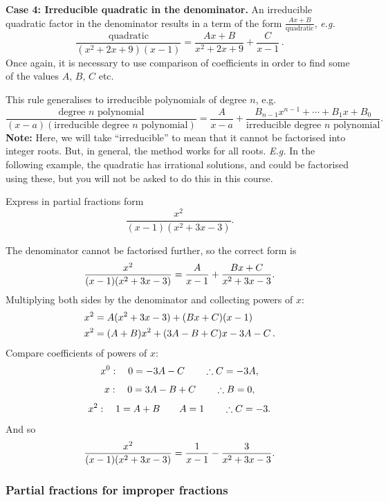 \textbf{Case 4: Irreducible quadratic in the denominator.} An irreducible quadratic factor in the denominator results in a term of the form $\frac{Ax+B}{\text{quadratic}}$, \textit{e.g.}
\begin{equation*}
    \frac{\text{quadratic}}{(x^2+2x+9)(x-1)}=\frac{Ax+B}{x^2+2x+9}+\frac{C}{x-1} \, .
\end{equation*}
Once again, it is necessary to use comparison of coefficients in order to find some of the values $A$, $B$, $C$ etc.

This rule generalises to irreducible polynomials of degree $n$, e.g.
\begin{equation}
\frac{\text{degree }n\text{ polynomial}}{(x-a)(\text{irreducible degree }n\text{ polynomial})}
=
\frac{A}{x-a}+\frac{B_{n-1}x^{n-1}+\cdots+B_1x+B_0}{\text{irreducible degree }n\text{ polynomial}}.
\end{equation}
\textbf{Note:} Here, we will take ``irreducible'' to mean that it cannot be factorised into integer roots. But, in general, the method works for all roots. \textit{E.g.} In the following example, the quadratic has irrational solutions, and could be factorised using these, but you will not be asked to do this in this course. 

\goodbreak 
\begin{example}[Video]
Express in partial fractions form
\[
\frac{x^2}{(x-1)(x^2+3x-3)}.
\]
\end{example}
%
\begin{solution}
The denominator cannot be factorised further, so the correct form is
\[
\frac{x^2}{(x-1)(x^2+3x-3)}=\frac{A}{x-1}+\frac{Bx+C}{x^2+3x-3}.
\]
Multiplying both sides by the denominator and collecting powers of $x$:
\begin{align*}
    x^2 &= A(x^2+3x-3) + (Bx+C)(x-1) \\
    x^2 &= (A+B)x^2+(3A-B+C)x-3A-C \, .
\end{align*}
Compare coefficients of powers of $x$:
\[
x^0:\quad 0=-3A-C \qquad \therefore C=-3A,
\]
\[
x:\quad 0=3A-B+C \qquad \therefore B=0,
\]
\[
x^2:\quad 1=A+B \qquad A=1 \qquad \therefore C=-3.
\]
And so
\[
\frac{x^2}{(x-1)(x^2+3x-3)}=\frac{1}{x-1}-\frac{3}{x^2+3x-3}.
\]
\end{solution}

\subsubsection{Partial fractions for improper fractions}

